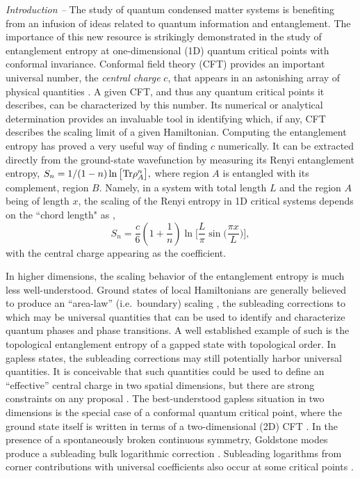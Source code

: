 \documentclass[prb,aps,twocolumn,floatfix,amsmath,amssymb,superscriptaddress,tightenlines]{revtex4}
\begin{document}
{\it Introduction --} 
The study of quantum condensed matter systems
 is benefiting from an infusion of ideas related to quantum information and entanglement. The importance of this new resource is strikingly 
demonstrated in the study of entanglement entropy at one-dimensional (1D) quantum critical points with conformal invariance. Conformal field theory (CFT) provides an important
universal number, the {\it central charge} $c$, that appears in an astonishing array of physical
quantities \cite{Cardyubiquitous}. A given CFT, and
thus any quantum critical points it describes, can be
characterized by this number.
Its numerical or analytical determination provides an invaluable tool in identifying which, if any, CFT describes the scaling limit of a given Hamiltonian. 
Computing the entanglement entropy has proved a very useful way of finding $c$ numerically. It can be extracted 
directly from the ground-state wavefunction by measuring its Renyi
entanglement entropy, $ S_n = 1/(1-n) \ln \big[ {\rm Tr} \rho_A^n
\big], $ where region $A$ is entangled with its complement, region
$B$. Namely, in a system with total length $L$ and the region $A$ being of length $x$, the scaling of the Renyi entropy in 1D critical systems depends on the ``chord length" as \cite{Holzhey,VidalC,
Korepin,Cardy},
\begin{equation}
S_n = \frac{c}{6}\left({1+ \frac{1}{n} }\right) \ln\Big[ \frac{L}{\pi} \sin\big( \frac{\pi x}{L} \big) \Big], \label{1Dcft}
\end{equation}
with the central charge appearing as the coefficient.


In higher dimensions, the scaling behavior of the entanglement entropy
is much less well-understood.  Ground states of local Hamiltonians are
generally believed to produce an ``area-law'' (i.e.\ boundary) scaling
\cite{ALreview}, the subleading corrections to which may be universal
quantities that can be used to identify and characterize quantum
phases and phase transitions.  A well established example of such is the 
topological entanglement entropy \cite{Alioscia1,Alioscia2,KP,LW} of
a gapped state with topological order.  In gapless states, the
subleading corrections may still potentially harbor universal
quantities. It is conceivable that such quantities could be used to define an
``effective'' central charge in two spatial dimensions, but there are strong constraints on any proposal \cite{EE_CFT}. The best-understood gapless situation in two dimensions is the special case of a conformal quantum critical point,
where the ground state itself is written in terms of a two-dimensional (2D)
CFT \cite{Moore06,Hsu08,Misguich,Oshikawa,Hsu10,Zaletel,Stephan11}. In the presence of a spontaneously broken
continuous symmetry, Goldstone modes produce a subleading bulk
logarithmic correction \cite{HeisLog,MaxLog}.  Subleading logarithms
from corner contributions with universal coefficients also occur at
some critical points \cite{Moore06,logcorner,Max}.  
\end{document}
